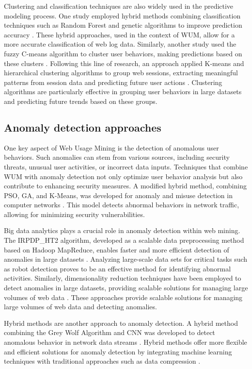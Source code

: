Clustering and classification techniques are also widely used in the predictive modeling process. One study employed hybrid methods combining classification techniques such as Random Forest and genetic algorithms to improve prediction accuracy \cite{Malik2021a}. These hybrid approaches, used in the context of WUM, allow for a more accurate classification of web log data. Similarly, another study used the fuzzy C-means algorithm to cluster user behaviors, making predictions based on these clusters \cite{Serin2022}. Following this line of research, an approach applied K-means and hierarchical clustering algorithms to group web sessions, extracting meaningful patterns from session data and predicting future user actions \cite{Sowmya2022}. Clustering algorithms are particularly effective in grouping user behaviors in large datasets and predicting future trends based on these groups.


\subsection{Anomaly detection approaches}

One key aspect of Web Usage Mining is the detection of anomalous user behaviors. Such anomalies can stem from various sources, including security threats, unusual user activities, or incorrect data inputs. Techniques that combine WUM with anomaly detection not only optimize user behavior analysis but also contribute to enhancing security measures. A modified hybrid method, combining PSO, GA, and K-Means, was developed for anomaly and misuse detection in computer networks \cite{Yuan2022}. This model detects abnormal behaviors in network traffic, allowing for minimizing security vulnerabilities.

Big data analytics plays a crucial role in anomaly detection within web mining. The IRPDP\_HT2 algorithm, developed as a scalable data preprocessing method based on Hadoop MapReduce, enables faster and more efficient detection of anomalies in large datasets \cite{Zhang2023}. Analyzing large-scale data sets for critical tasks such as robot detection proves to be an effective method for identifying abnormal activities. Similarly, dimensionality reduction techniques have been employed to detect anomalies in large datasets, providing scalable solutions for managing large volumes of web data \cite{Liu2022}. These approaches provide scalable solutions for managing large volumes of web data and detecting anomalies.

Hybrid methods are another approach to anomaly detection. A hybrid method combining the Grey Wolf Algorithm and CNN was developed to detect anomalous behavior in network data streams \cite{Wang2023}. Hybrid methods offer more flexible and efficient solutions for anomaly detection by integrating machine learning techniques with traditional approaches such as data compression \cite{Prasanth2015}.